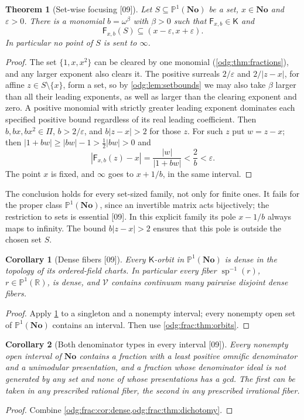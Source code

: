 \documentclass[11pt,oneside]{article}
\numberwithin{equation}{section}
\newtheorem{theorem}{Theorem}[section]
\newtheorem{corollary}[corollary]{Corollary}
\theoremstyle{definition}
\theoremstyle{remark}
\newcommand{\No}{\mathbf{No}}
\newcommand{\R}{\mathbb R}
\newcommand{\src}[1]{\textup{\textsf{\small[#1]}}}
\newcommand{\spz}{\operatorname{sp}}
\newcommand{\Vreg}{\mathcal V}
\newcommand{\Kcong}{\mathsf K}
\begin{document}
\begin{theorem}[Set-wise focusing \src{09}]\label{odg:frac:thm:focusing}
Let $S\subseteq\mathbb P^1(\No)$ be a set, $x\in\No$ and $\varepsilon>0$. There is
a monomial $b=\omega^\beta$ with $\beta>0$ such that $\mathsf F_{x,b}\in\Kcong$ and
\[
 \mathsf F_{x,b}(S)\subseteq(x-\varepsilon,x+\varepsilon).
\]
In particular no point of $S$ is sent to $\infty$.
\end{theorem}
\begin{proof}
The set $\{1,x,x^2\}$ can be cleared by one monomial (\cref{odg:thm:fractions}),
and any larger exponent also clears it. The positive surreals $2/\varepsilon$
and $2/|z-x|$, for affine $z\in S\setminus\{x\}$, form a set, so by
\cref{odg:lem:setbounds} we may also take $\beta$ larger than all their leading
exponents, as well as larger than the clearing exponent and zero. A
positive monomial with strictly greater leading exponent dominates each
specified positive bound regardless of its real leading coefficient.
Then $b,bx,bx^2\in\Pi$, $b>2/\varepsilon$, and $b|z-x|>2$ for those
$z$. For such $z$ put $w=z-x$; then $|1+bw|\ge|bw|-1>\tfrac12|bw|>0$ and
\[
 |\mathsf F_{x,b}(z)-x|=\frac{|w|}{|1+bw|}<\frac2b<\varepsilon .
\]
The point $x$ is fixed, and $\infty$ goes to $x+1/b$, in the same interval.
\end{proof}

The conclusion holds for every set-sized family, not only for finite ones. It
fails for the proper class $\mathbb P^1(\No)$, since an invertible matrix acts
bijectively; the restriction to sets is essential \src{09}. In this explicit
family its pole $x-1/b$ always maps to infinity. The bound $b|z-x|>2$
ensures that this pole is outside the chosen set $S$.

\begin{corollary}[Dense fibers \src{09}]\label{odg:frac:cor:dense}
Every $\Kcong$-orbit in $\mathbb P^1(\No)$ is dense in the topology of its
ordered-field charts. In particular every fiber $\spz^{-1}(r)$, $r\in\mathbb P^1(\R)$, is dense, and
$\Vreg$ contains continuum many pairwise disjoint dense fibers.
\end{corollary}
\begin{proof}
Apply \cref{odg:frac:thm:focusing} to a singleton and a nonempty interval;
every nonempty open set of $\mathbb P^1(\No)$ contains an interval. Then use
\cref{odg:frac:thm:orbits}.
\end{proof}

\begin{corollary}[Both denominator types in every interval \src{09}]\label{odg:frac:cor:bothtypes}
Every nonempty open interval of $\No$ contains a fraction with a least positive
omnific denominator and a unimodular presentation, and a fraction whose
denominator ideal is not generated by any set and none of whose presentations
has a gcd. The first can be taken in any prescribed rational fiber, the second
in any prescribed irrational fiber.
\end{corollary}
\begin{proof}
Combine \cref{odg:frac:cor:dense,odg:frac:thm:dichotomy}.
\end{proof}
\end{document}
